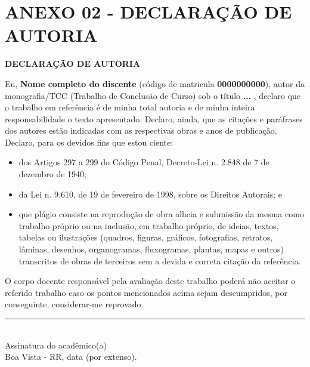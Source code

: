 \section{ANEXO 02 - DECLARAÇÃO DE AUTORIA}
\label{sec:anexo-2}


\begin{center}
    \fontsize{12}{15}\selectfont
    \vspace*{0.5cm}
    \textbf{DECLARAÇÃO DE AUTORIA}
    \vspace*{1cm}
\end{center}

\vspace*{\fill}

Eu, \textbf{Nome completo do discente} (código de matricula \textbf{0000000000}), autor da monografia/TCC (Trabalho de Conclusão de Curso) sob o título \textbf{ ... }, declaro que o trabalho em referência é de minha total autoria e de minha inteira responsabilidade o texto apresentado. Declaro, ainda, que as citações e paráfrases dos  autores estão indicadas com as respectivas obras e anos de publicação. Declaro, para os devidos fins que estou ciente:
\begin{itemize}\setlength\itemsep{.02em}
    \item  dos Artigos 297 a 299 do Código Penal, Decreto-Lei n. 2.848 de 7 de dezembro de 1940;
    \item  da Lei n. 9.610, de 19 de fevereiro de 1998, sobre os Direitos Autorais; e
    \item  que plágio consiste na reprodução de obra alheia e submissão da mesma como trabalho próprio ou na inclusão, em trabalho próprio, de ideias, textos, tabelas ou ilustrações (quadros, figuras, gráficos, fotografias, retratos, lâminas, desenhos, organogramas, fluxogramas, plantas, mapas e outros) transcritos de obras de terceiros sem a devida e correta citação da referência.
\end{itemize}

O corpo docente responsável pela avaliação deste trabalho poderá  não  aceitar o referido trabalho caso os pontos mencionados acima sejam descumpridos, por conseguinte, considerar-me reprovado.

\vspace*{\fill}

\begin{center}
    \rule{7cm}{0.4pt} \\
    \fontsize{12}{15}\selectfont Assinatura do acadêmico(a) \\ 
    Boa Vista - RR, data (por extenso).
\end{center}

\vfill